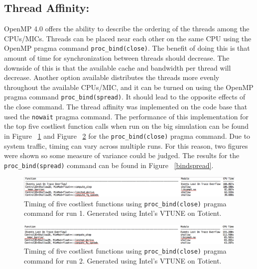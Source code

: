 \documentclass[12pt]{article}
\begin{document}
		\subsection{Thread Affinity:}
		OpenMP 4.0 offers the ability to describe the ordering of the threads among the CPUs/MICs. Threads can be placed near each other on the same CPU using the OpenMP pragma command \texttt{proc\_bind(close)}. The benefit of doing this is that amount of time for synchronization between threads should decrease. The downside of this is that the available cache and bandwidth per thread will decrease. Another option available distributes the threads more evenly throughout the available CPUs/MIC, and it can be turned on using the OpenMP pragma command \texttt{proc\_bind(spread)}. It should lead to the opposite effects of the close command. The thread affinity was implemented on the code base that used the \texttt{nowait} pragma command. The performance of this implementation for the top five costliest function calls when run on the big simulation can be found in Figure ~\ref{nowait} and Figure ~\ref{nowait2} for the \texttt{proc\_bind(close)} pragma command. Due to system traffic, timing can vary across multiple runs. For this reason, two figures were shown so some measure of variance could be judged. The results for the \texttt{proc\_bind(spread)} command can be found in Figure ~\ref{bindspread}.
		
		\begin{figure}[h]
			\begin{center}
				\includegraphics[width=0.8\columnwidth]{nowait}
				\caption{Timing of five costliest functions using \texttt{proc\_bind(close)} pragma command for run 1. Generated using Intel's VTUNE on Totient.}
				\label{nowait}
			\end{center}
		\end{figure}
		
		\begin{figure}[h]
			\begin{center}
				\includegraphics[width=0.8\columnwidth]{nowait2}
				\caption{Timing of five costliest functions using \texttt{proc\_bind(close)} pragma command for run 2. Generated using Intel's VTUNE on Totient.}
				\label{nowait2}
			\end{center}
		\end{figure}
		
\end{document}
